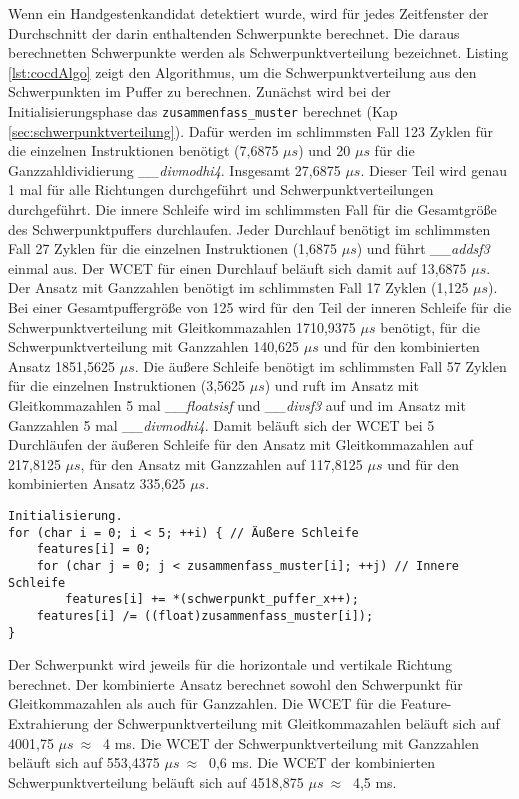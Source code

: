 Wenn ein Handgestenkandidat detektiert wurde, wird für jedes Zeitfenster der Durchschnitt der darin enthaltenden Schwerpunkte berechnet. Die daraus berechnetten Schwerpunkte werden als Schwerpunktverteilung bezeichnet.
Listing \ref{lst:cocdAlgo} zeigt den Algorithmus, um die Schwerpunktverteilung aus den Schwerpunkten im Puffer zu berechnen. Zunächst wird bei der Initialisierungsphase das \texttt{zusammenfass\_muster} berechnet
(Kap \ref{sec:schwerpunktverteilung}). Dafür werden im schlimmsten Fall 123 Zyklen für die einzelnen Instruktionen benötigt (7,6875 $\mu s$) und 20 $\mu s$ für die Ganzzahldividierung \textit{\_\_divmodhi4}. Insgesamt
27,6875 $\mu s$. Dieser Teil wird genau 1 mal für alle Richtungen durchgeführt und Schwerpunktverteilungen durchgeführt. Die innere Schleife wird im schlimmsten Fall für die Gesamtgröße des Schwerpunktpuffers durchlaufen.
Jeder Durchlauf benötigt im schlimmsten Fall 27 Zyklen für die einzelnen Instruktionen (1,6875 $\mu s$) und führt \textit{\_\_addsf3} einmal aus. Der WCET für einen Durchlauf beläuft sich damit auf 13,6875 $\mu s$.
Der Ansatz mit Ganzzahlen benötigt im schlimmsten Fall 17 Zyklen (1,125 $\mu s$). Bei einer Gesamtpuffergröße von 125 wird für den Teil der inneren Schleife für die Schwerpunktverteilung mit Gleitkommazahlen
1710,9375 $\mu s$ benötigt, für die Schwerpunktverteilung mit Ganzzahlen 140,625 $\mu s$ und für den kombinierten Ansatz 1851,5625 $\mu s$. Die äußere Schleife benötigt im schlimmsten Fall 57 Zyklen für die einzelnen
Instruktionen (3,5625 $\mu s$) und ruft im Ansatz mit Gleitkommazahlen 5 mal \textit{\_\_floatsisf} und \textit{\_\_divsf3} auf und im Ansatz mit Ganzzahlen 5 mal \textit{\_\_divmodhi4}. Damit beläuft sich der WCET
bei 5 Durchläufen der äußeren Schleife für den Ansatz mit Gleitkommazahlen auf 217,8125 $\mu s$, für den Ansatz mit Ganzzahlen auf 117,8125 $\mu s$ und für den kombinierten Ansatz 335,625 $\mu s$.
\begin{lstlisting}[label=lst:cocdAlgo,caption={Algorithmus um die Schwerpunktverteilung in horizontaler Richtung zu berechnen.}]
Initialisierung.
for (char i = 0; i < 5; ++i) { // Äußere Schleife
    features[i] = 0;
    for (char j = 0; j < zusammenfass_muster[i]; ++j) // Innere Schleife
        features[i] += *(schwerpunkt_puffer_x++);
    features[i] /= ((float)zusammenfass_muster[i]);
}
\end{lstlisting}
Der Schwerpunkt wird jeweils für die horizontale und vertikale Richtung berechnet. Der kombinierte Ansatz berechnet sowohl den Schwerpunkt für Gleitkommazahlen als auch für Ganzzahlen. Die WCET für die Feature-Extrahierung
der Schwerpunktverteilung mit Gleitkommazahlen beläuft sich auf 4001,75 $\mu s\ \approx\ $ 4 ms. Die WCET der Schwerpunktverteilung mit Ganzzahlen beläuft sich auf 553,4375 $\mu s\ \approx\ $ 0,6 ms. Die WCET der kombinierten
Schwerpunktverteilung beläuft sich auf 4518,875 $\mu s\ \approx\ $ 4,5 ms.
